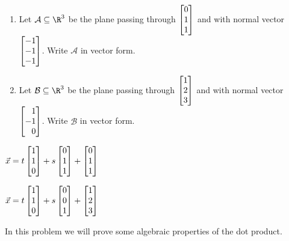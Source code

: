 \begin{exercises}
\begin{problist}
		\prob
		\begin{enumerate}
			\item Let $\mathcal A\subseteq \R^3$ be the plane passing through $\mat{0\\1\\1}$
			and with normal vector $\mat{-1\\-1\\-1}$. Write $\mathcal A$ in vector form.
			\item Let $\mathcal B\subseteq \R^3$ be the plane passing through $\mat{1\\2\\3}$
			and with normal vector $\mat{1\\-1\\0}$. Write $\mathcal B$ in vector form.
		\end{enumerate}
		\begin{solution}
			\begin{enumerate*} 
				\item $\vec x = t\mat{1\\1\\0}+s\mat{0\\1\\1} + \mat{0\\1\\1}$
				\item $\vec x = t\mat{1\\1\\0}+s\mat{0\\0\\1}+\mat{1\\2\\3}$ 
			\end{enumerate*}
		\end{solution}
		
		\prob In this problem we will prove some algebraic properties of the dot product.
		\begin{enumerate}
			

\end{enumerate}
\end{problist}
\end{exercises}
